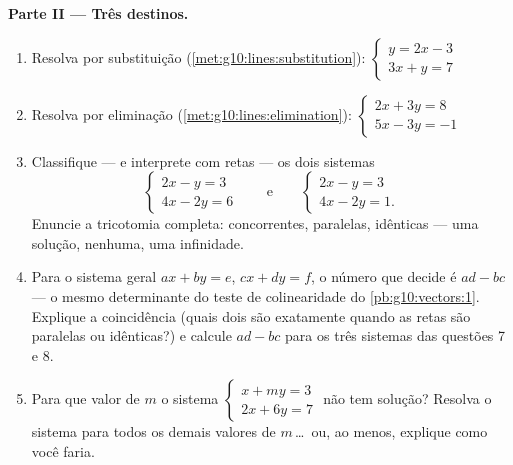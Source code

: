 \begin{problem}
\medskip
\noindent\textbf{Parte II --- Três destinos.}
\begin{enumerate}[resume]
  \item Resolva por substituição
        (\cref{met:g10:lines:substitution}):
        $\begin{cases} y = 2x - 3 \\ 3x + y = 7 \end{cases}$
  \item Resolva por eliminação
        (\cref{met:g10:lines:elimination}):
        $\begin{cases} 2x + 3y = 8 \\ 5x - 3y = -1 \end{cases}$
  \item Classifique --- e interprete com retas --- os dois
        sistemas
        \[
        \begin{cases} 2x - y = 3 \\ 4x - 2y = 6 \end{cases}
        \qquad\text{e}\qquad
        \begin{cases} 2x - y = 3 \\ 4x - 2y = 1 . \end{cases}
        \]
        Enuncie a tricotomia completa: concorrentes, paralelas,
        idênticas --- uma solução, nenhuma, uma infinidade.
  \item Para o sistema geral $ax + by = e$, $cx + dy = f$, o
        número que decide é $ad - bc$ --- o mesmo determinante do
        teste de colinearidade do \cref{pb:g10:vectors:1}.
        Explique a coincidência (quais dois  são
         exatamente quando as retas são paralelas ou
        idênticas?) e calcule $ad - bc$ para os três sistemas das
        questões 7 e 8.
  \item Para que valor de $m$ o sistema
        $\begin{cases} x + my = 3 \\ 2x + 6y = 7 \end{cases}$
        não tem solução? Resolva o sistema para todos os demais
        valores de $m$\,\dots\ ou, ao menos, explique como você
        faria.
\end{enumerate}


\end{problem}
